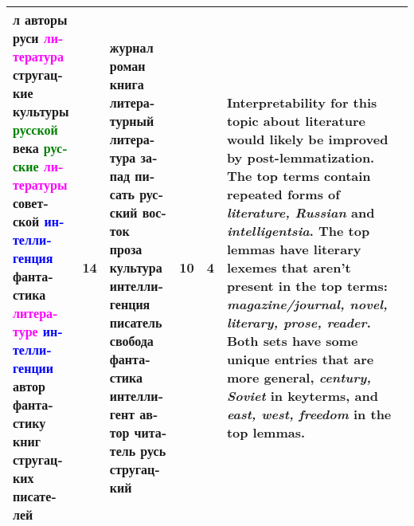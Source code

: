 \documentclass[11pt,a4paper]{article}
\begin{document}
\begin{landscape}
\begin{table*}[h!]
\begin{tabularx}{\textwidth}{|X|l|X|l|l|X|}
    \foreignlanguage{russian}{\textbf{л} авторы \textbf{руси} \textcolor{magenta}{литература} стругацкие культуры \textcolor{green}{русской} \textbf{века} \textcolor{green}{русские} \textcolor{magenta}{литературы} \textbf{советской} \textcolor{blue}{интеллигенция} фантастика \textcolor{magenta}{литературе} \textcolor{blue}{интеллигенции} автор фантастику книг стругацких писателей} & 14 & \foreignlanguage{russian}{\textbf{журнал роман} книга \textbf{литературный} литература \textbf{запад} писать русский \textbf{восток} \textbf{проза} культура интеллигенция писатель \textbf{свобода} фантастика \textbf{интеллигент} автор \textbf{читатель} русь стругацкий} & 10 & 4 & Interpretability for this topic about literature would likely be improved by post-lemmatization. The top terms contain repeated forms of \textit{literature, Russian} and \textit{intelligentsia}. The top lemmas have literary lexemes that aren't present in the top terms: \textit{magazine/journal, novel, literary, prose, reader}. Both sets have some unique entries that are more general, \textit{century, Soviet} in keyterms, and \textit{east, west, freedom} in the top lemmas. \\ \hline
    \end{tabularx}
\end{table*}

\end{landscape}
\end{document}
